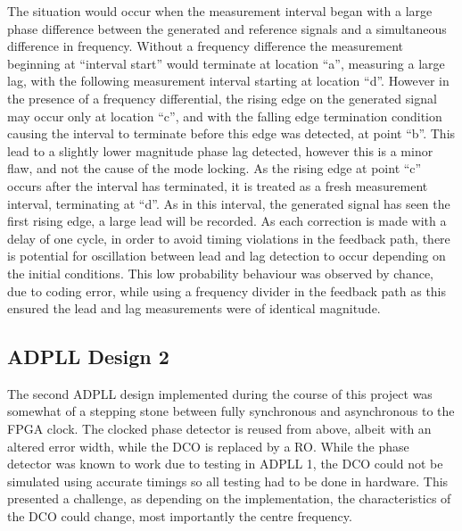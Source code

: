 The situation would occur when the measurement interval began with a large phase difference between the generated and reference signals and a simultaneous difference in frequency. Without a frequency difference the measurement beginning at ``interval start'' would terminate at location ``a'', measuring a large lag, with the following measurement interval starting at location ``d''. However in the presence of a frequency differential, the rising edge on the generated signal may occur only at location ``c'', and with the falling edge termination condition causing the interval to terminate before this edge was detected, at point ``b''. This lead to a slightly lower magnitude phase lag detected, however this is a minor flaw, and not the cause of the mode locking. As the rising edge at point ``c'' occurs after the interval has terminated, it is treated as a fresh measurement interval, terminating at ``d''. As in this interval, the generated signal has seen the first rising edge, a large lead will be recorded. As each correction is made with a delay of one cycle, in order to avoid timing violations in the feedback path, there is potential for oscillation between lead and lag detection to occur depending on the initial conditions. This low probability behaviour was observed by chance, due to coding error, while using a frequency divider in the feedback path as this ensured the lead and lag measurements were of identical magnitude. 

\subsection{\acs{ADPLL} Design 2}
The second \ac{ADPLL} design implemented during the course of this project was somewhat of a stepping stone between fully synchronous and asynchronous to the \ac{FPGA} clock. The clocked phase detector is reused from above, albeit with an altered error width, while the \ac{DCO} is replaced by a \acl{RO}. While the phase detector was known to work due to testing in \ac{ADPLL} 1, the \ac{DCO} could not be simulated using accurate timings so all testing had to be done in hardware. This presented a challenge, as depending on the implementation, the characteristics of the \ac{DCO} could change, most importantly the centre frequency. 

